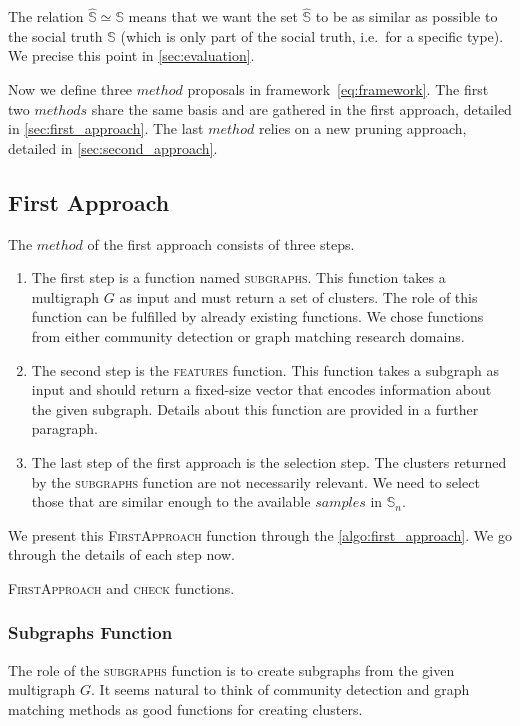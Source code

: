 \documentclass{llncs}
\begin{document}
The relation \(\hat{\mathbb{S}} \simeq \mathbb{S}\) means that we want the set \(\hat{\mathbb{S}}\) to be as similar as possible to the social truth \(\mathbb{S}\) (which is only part of the social truth, i.e.\ for a specific type).
We precise this point in \autoref{sec:evaluation}.

Now we define three \(method\) proposals in framework~\eqref{eq:framework}.
The first two \(methods\) share the same basis and are gathered in the first approach, detailed in \autoref{sec:first_approach}.
The last \(method\) relies on a new pruning approach, detailed in \autoref{sec:second_approach}.

\subsection{First Approach}\label{sec:first_approach}

The \(method\) of the first approach consists of three steps.

\begin{enumerate}
\item The first step is a function named \textsc{subgraphs}.
This function takes a multigraph \(G\) as input and must return a set of clusters.
The role of this function can be fulfilled by already existing functions.
We chose functions from either community detection or graph matching research domains.
\item The second step is the \textsc{features} function.
This function takes a subgraph as input and should return a fixed-size vector that encodes information about the given subgraph.
Details about this function are provided in a further paragraph.
\item The last step of the first approach is the selection step.
The clusters returned by the \textsc{subgraphs} function are not necessarily relevant.
We need to select those that are similar enough to the available \(samples\) in \(\mathbb{S}_n\).
\end{enumerate}

We present this \textsc{FirstApproach} function through the \autoref{algo:first_approach}.
We go through the details of each step now.

\begin{algorithm}

\caption{\textsc{FirstApproach} and \textsc{check} functions.}%
\label{algo:first_approach}
\end{algorithm}

\subsubsection{Subgraphs Function}\label{sec:subgraphs}
The role of the \textsc{subgraphs} function is to create subgraphs from the given multigraph \(G\).
It seems natural to think of community detection and graph matching methods as good functions for creating clusters.
\end{document}
